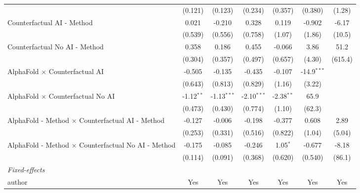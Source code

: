 \begin{tabular}{lcccccc}
                                                              & (0.121)      & (0.123)       & (0.234)       & (0.357)      & (0.380)       & (1.28)\\   
   Counterfactual AI - Method                                 & 0.021        & -0.210        & 0.328         & 0.119        & -0.902        & -6.17\\   
                                                              & (0.539)      & (0.556)       & (0.758)       & (1.07)       & (1.86)        & (10.5)\\   
   Counterfactual No AI - Method                              & 0.358        & 0.186         & 0.455         & -0.066       & 3.86          & 51.2\\   
                                                              & (0.304)      & (0.357)       & (0.497)       & (0.657)      & (4.30)        & (615.4)\\   
   AlphaFold $\times$ Counterfactual AI                       & -0.505       & -0.135        & -0.435        & -0.107       & -14.9$^{***}$ &   \\   
                                                              & (0.643)      & (0.813)       & (0.829)       & (1.16)       & (3.22)        &   \\   
   AlphaFold $\times$ Counterfactual No AI                    & -1.12$^{**}$ & -1.13$^{***}$ & -2.10$^{***}$ & -2.38$^{**}$ & 65.9          &   \\   
                                                              & (0.473)      & (0.430)       & (0.774)       & (1.10)       & (62.3)        &   \\   
   AlphaFold - Method $\times$ Counterfactual AI - Method     & -0.127       & -0.006        & -0.198        & -0.377       & 0.608         & 2.89\\   
                                                              & (0.253)      & (0.331)       & (0.516)       & (0.822)      & (1.04)        & (5.04)\\   
   AlphaFold - Method $\times$ Counterfactual No AI - Method  & -0.175       & -0.085        & -0.246        & 1.05$^{*}$   & -0.677        & -8.18\\   
                                                              & (0.114)      & (0.091)       & (0.368)       & (0.620)      & (0.540)       & (86.1)\\   
   \midrule
   \emph{Fixed-effects}\\
   author                                                     & Yes          & Yes           & Yes           & Yes          & Yes           & Yes\\  

\end{tabular}
